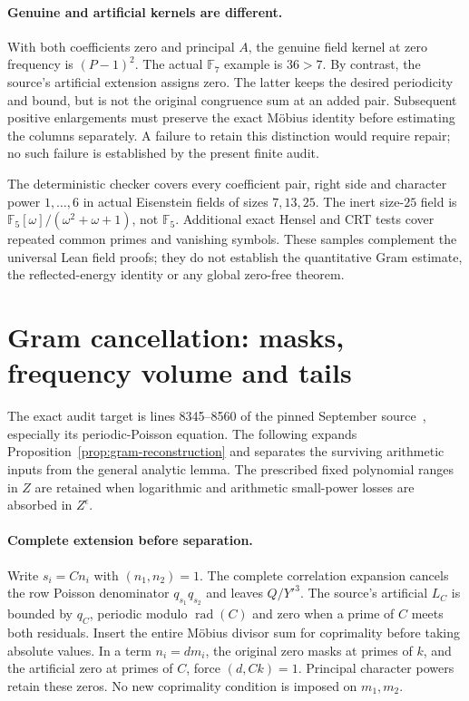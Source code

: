 \paragraph{Genuine and artificial kernels are different.}
With both coefficients zero and principal $A$, the genuine field kernel
at zero frequency is $(P-1)^2$. The actual $\mathbb F_7$ example is
$36>7$. By contrast, the source's artificial extension assigns zero.
The latter keeps the desired periodicity and bound, but is not the
original congruence sum at an added pair. Subsequent positive enlargements
must preserve the exact M\"obius identity before estimating the columns
separately. A failure to retain this distinction would require repair;
no such failure is established by the present finite audit.

The deterministic checker covers every coefficient pair, right side and
character power $1,\ldots,6$ in actual Eisenstein fields of sizes $7,13,25$.
The inert size-$25$ field is
$\mathbb F_5[\omega]/(\omega^2+\omega+1)$, not $\mathbb F_5$.
Additional exact Hensel and CRT tests cover repeated common primes and
vanishing symbols. These samples complement the universal Lean field
proofs; they do not establish the quantitative Gram estimate, the
reflected-energy identity or any global zero-free theorem.

\section{Gram cancellation: masks, frequency volume and tails}
The exact audit target is lines 8345--8560 of the pinned September
source~\cite{mathsource}, especially its periodic-Poisson equation.
The following expands Proposition~\ref{prop:gram-reconstruction} and
separates the surviving arithmetic inputs from the general analytic lemma.
The prescribed fixed polynomial ranges in $Z$ are retained when
logarithmic and arithmetic small-power losses are absorbed in $Z^\epsilon$.

\paragraph{Complete extension before separation.}
Write $s_i=Cn_i$ with $(n_1,n_2)=1$. The complete correlation expansion
cancels the row Poisson denominator $q_{s_1}q_{s_2}$ and leaves
$Q/Y'^3$. The source's artificial $L_C$ is bounded by $q_C$, periodic
modulo $\operatorname{rad}(C)$ and zero when a prime of $C$ meets both
residuals. Insert the entire M\"obius divisor sum for coprimality before
taking absolute values. In a term $n_i=dm_i$, the original zero masks
at primes of $k$, and the artificial zero at primes of $C$, force
$(d,Ck)=1$. Principal character powers retain these zeros.
No new coprimality condition is imposed on $m_1,m_2$.

